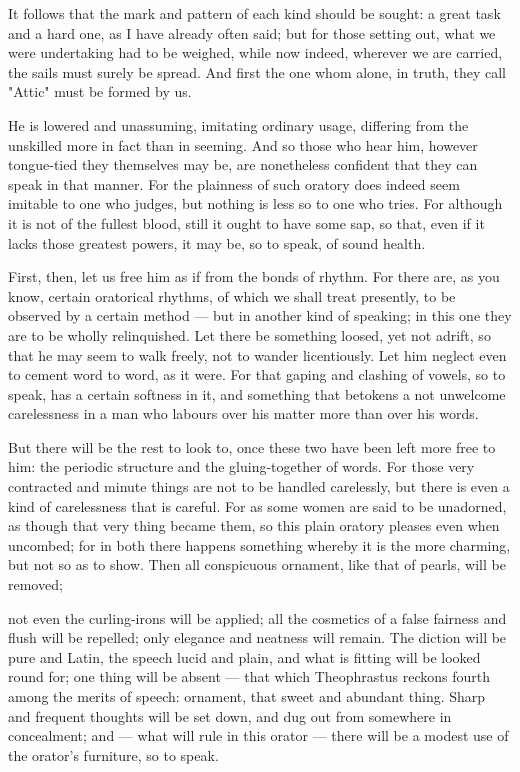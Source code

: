  It follows that the mark and pattern of each kind should be sought: a great task and a hard one, as I have already often said; but for those setting out, what we were undertaking had to be weighed, while now indeed, wherever we are carried, the sails must surely be spread. And first the one whom alone, in truth, they call "Attic" must be formed by us.

 He is lowered and unassuming, imitating ordinary usage, differing from the unskilled more in fact than in seeming. And so those who hear him, however tongue-tied they themselves may be, are nonetheless confident that they can speak in that manner. For the plainness of such oratory does indeed seem imitable to one who judges, but nothing is less so to one who tries. For although it is not of the fullest blood, still it ought to have some sap, so that, even if it lacks those greatest powers, it may be, so to speak, of sound health.

 First, then, let us free him as if from the bonds of rhythm. For there are, as you know, certain oratorical rhythms, of which we shall treat presently, to be observed by a certain method — but in another kind of speaking; in this one they are to be wholly relinquished. Let there be something loosed, yet not adrift, so that he may seem to walk freely, not to wander licentiously. Let him neglect even to cement word to word, as it were. For that gaping and clashing of vowels, so to speak, has a certain softness in it, and something that betokens a not unwelcome carelessness in a man who labours over his matter more than over his words.

 But there will be the rest to look to, once these two have been left more free to him: the periodic structure and the gluing-together of words. For those very contracted and minute things are not to be handled carelessly, but there is even a kind of carelessness that is careful. For as some women are said to be unadorned, as though that very thing became them, so this plain oratory pleases even when uncombed; for in both there happens something whereby it is the more charming, but not so as to show. Then all conspicuous ornament, like that of pearls, will be removed;

 not even the curling-irons will be applied; all the cosmetics of a false fairness and flush will be repelled; only elegance and neatness will remain. The diction will be pure and Latin, the speech lucid and plain, and what is fitting will be looked round for; one thing will be absent — that which Theophrastus reckons fourth among the merits of speech: ornament, that sweet and abundant thing. Sharp and frequent thoughts will be set down, and dug out from somewhere in concealment; and — what will rule in this orator — there will be a modest use of the orator's furniture, so to speak.

